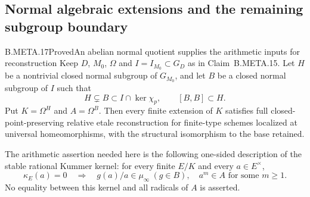 \subsection{Normal algebraic extensions and the remaining subgroup boundary}

\begin{claim}{B.META.17}{Proved}{An abelian normal quotient supplies the arithmetic inputs for reconstruction}
Keep $D$, $M_0$, $\Omega$ and
$I=I_{M_0}\subset G_D$ as in Claim~B.META.15.
Let $H$ be a nontrivial closed normal subgroup of
$G_{M_0}$, and let $B$ be a closed normal subgroup
of $I$ such that
\[
 H\subsetneq B\subset I\cap\ker\chi_p,
                         \qquad [B,B]\subset H.
                                                        \tag{META.NG1}
\]
Put $K=\Omega^H$ and $A=\Omega^B$.
Then every finite extension of $K$ satisfies full
closed-point-preserving relative etale reconstruction
for finite-type schemes localized at universal
homeomorphisms, with the structural isomorphism
to the base retained.

The arithmetic assertion needed here is the following
one-sided description of the stable rational Kummer
kernel: for every finite $E/K$ and every $a\in E^\times$,
\[
 \kappa_E(a)=0\quad\Longrightarrow\quad
  g(a)/a\in\mu_\infty\ (g\in B),
 \quad a^m\in A\text{ for some }m\ge1.
                                                        \tag{META.NG2}
\]
No equality between this kernel and all radicals
of $A$ is asserted.
\end{claim}
